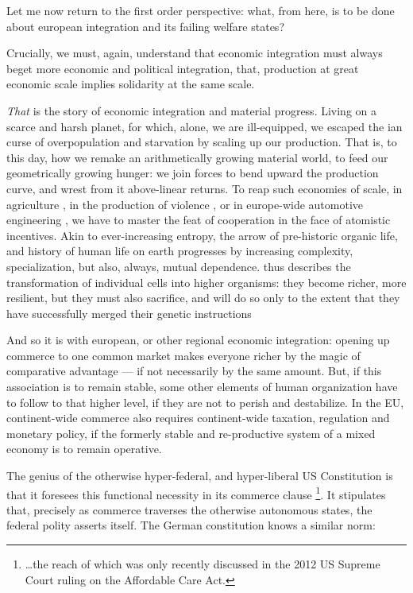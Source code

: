 \documentclass[11pt,a4paper,oneside,openright]{article}
\begin{document}
Let me now return to the first order perspective: 
what, from here, is to be done about european integration and its failing welfare states?

Crucially, we must, again, understand that economic integration must always beget more economic and political integration, that, production at great economic scale implies solidarity at the same scale.

\emph{That} is the story of economic integration and material progress. 
Living on a scarce and harsh planet, for which, alone, we are ill-equipped, we escaped the \citeauthor{Malthus1798}ian curse of overpopulation and starvation by scaling up our production. 
That is, to this day, how we remake an arithmetically growing material world, to feed our geometrically growing hunger: 
we join forces to bend upward the production curve, and wrest from it above-linear returns. 
To reap such economies of scale, in agriculture \citep{Diamond1997}, in the production of violence \citep{Tilly-1985-aa}, or in europe-wide automotive engineering \citep{Krugman-1980-aa}, we have to master the feat of cooperation in the face of atomistic incentives. 
Akin to ever-increasing entropy, the arrow of pre-historic organic life, and history of human life on earth progresses by increasing complexity, specialization, but also, always, mutual dependence. 
\citeauthor{Wright1994} thus describes the transformation of individual cells into higher organisms: 
they become richer, more resilient, but they must also sacrifice, and will do so only to the extent that they have successfully merged their genetic instructions \citeyearpar[Chapter 7, 8]{Wright1994}

And so it is with european, or other regional economic integration: 
opening up commerce to one common market makes everyone richer by the magic of comparative advantage --- if not necessarily by the same amount. 
But, if this association is to remain stable, some other elements of human organization have to follow to that higher level, if they are not to perish and destabilize. 
In the \gls{EU}, continent-wide commerce also requires continent-wide taxation, regulation and monetary policy, if the formerly stable and re-productive system of a mixed economy is to remain operative.

The genius of the otherwise hyper-federal, and hyper-liberal US Constitution is that it foresees this functional necessity in its commerce clause
\footnote{
	\ldots the reach of which was only recently discussed in the 2012 US Supreme Court ruling on the Affordable Care Act.
}.
It stipulates that, precisely as commerce traverses the otherwise autonomous states, the federal polity asserts itself. 
The German constitution knows a similar norm:
\end{document}
